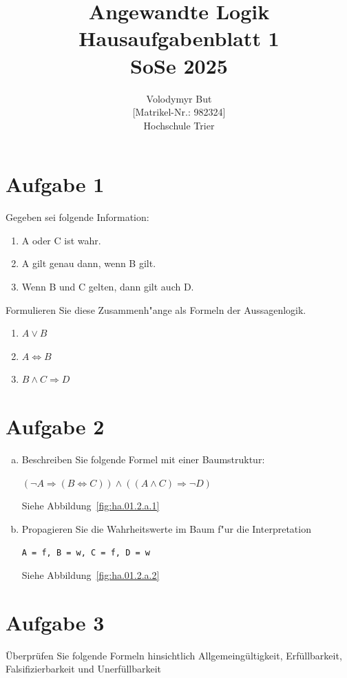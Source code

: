 \documentclass[10pt, oneside]{article}
\title{Angewandte Logik\\[15pt]\Large{Hausaufgabenblatt 1}\\[10pt]\Large{SoSe 2025}}
\author{Volodymyr But\\[5pt][Matrikel-Nr.: 982324]\\[10pt]Hochschule Trier}
\date{}
\begin{document}
\maketitle
\vspace{25px}

\section{Aufgabe 1}

Gegeben sei folgende Information:
\begin{enumerate}[1.]
    \item A oder C ist wahr.
    \item A gilt genau dann, wenn B gilt.
    \item Wenn B und C gelten, dann gilt auch D.
\end{enumerate}
Formulieren Sie diese Zusammenh"ange als Formeln der Aussagenlogik.
\begin{enumerate}[1.]
    \item $A \lor B$
    \item $A \Leftrightarrow B$
    \item $B \land C \Rightarrow D$
\end{enumerate}

\section{Aufgabe 2}

\begin{enumerate}[(a)]
    \item Beschreiben Sie folgende Formel mit einer Baumstruktur:

        $(\lnot A \Rightarrow (B \Leftrightarrow C)) \land ((A \land C) \Rightarrow \lnot D)$

        Siehe Abbildung~\ref{fig:ha.01.2.a.1}

    \item Propagieren Sie die Wahrheitswerte im Baum f"ur die Interpretation

        \verb|A = f, B = w, C = f, D = w|

        Siehe Abbildung~\ref{fig:ha.01.2.a.2}
\end{enumerate}

\pagebreak
\section{Aufgabe 3}

Überprüfen Sie folgende Formeln hinsichtlich Allgemeingültigkeit,
Erfüllbarkeit, Falsifizierbarkeit und Unerfüllbarkeit
\end{document}
